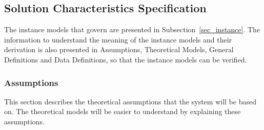 \documentclass[12pt]{article}
\begin{document}
\newpage

\subsection{Solution Characteristics Specification}


The instance models that govern \progname{} are presented in
Subsection~\ref{sec_instance}.  The information to understand the meaning of the
instance models and their derivation is also presented in Assumptions, 
Theoretical Models, General Definitions and Data Definitions, so that the 
instance
models can be verified.

\subsubsection{Assumptions} \label{sec_assumpt}


This section describes the theoretical assumptions that the system will be 
based on. The theoretical models will be easier to understand by explaining 
these assumptions.
\end{document}
